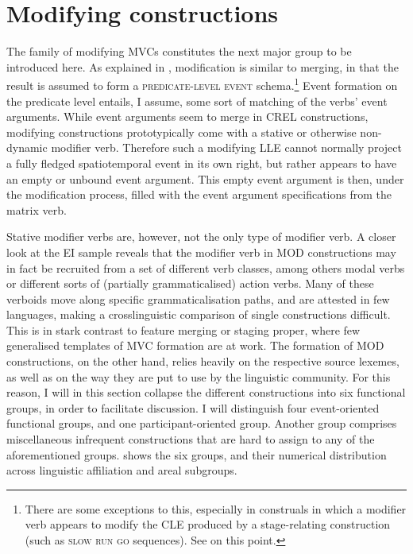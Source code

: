 \section{Modifying constructions}\label{sec:modifying}

The family of modifying MVCs constitutes the next major group to be introduced here. As explained in , modification is similar to merging, in that the result is assumed to form a \textsc{predicate-level event} schema.\footnote{There are some exceptions to this, especially in construals in which a modifier verb appears to modify the CLE produced by a stage-relating construction (such as \textsc{slow} \textsc{run} \textsc{go} sequences). See  on this point.} Event formation on the predicate level entails, I assume, some sort of matching of the verbs' event arguments. While event arguments seem to merge in CREL constructions, modifying constructions prototypically come with a stative or otherwise non-dynamic modifier verb. Therefore such a modifying LLE cannot normally project a fully fledged spatiotemporal event in its own right, but rather appears to have an empty or unbound event argument. This empty event argument is then, under the modification process, filled with the event argument specifications from the matrix verb.

Stative modifier verbs are, however, not the only type of modifier verb. A closer look at the EI sample reveals that the modifier verb in MOD constructions may in fact be recruited from a set of different verb classes, among others modal verbs or different sorts of (partially grammaticalised) action verbs. Many of these verboids move along specific grammaticalisation paths, and are attested in few languages, making a crosslinguistic comparison of single constructions difficult. This is in stark contrast to feature merging or staging proper, where few generalised templates of MVC formation are at work. The formation of MOD constructions, on the other hand, relies heavily on the respective source lexemes, as well as on the way they are put to use by the linguistic community. For this reason, I will in this section collapse the different constructions into six functional groups, in order to facilitate discussion. I will distinguish four event-oriented functional groups, and one participant-oriented group. Another group comprises miscellaneous infrequent constructions that are hard to assign to any of the aforementioned groups.  shows the six groups, and their numerical distribution across linguistic affiliation and areal subgroups.

